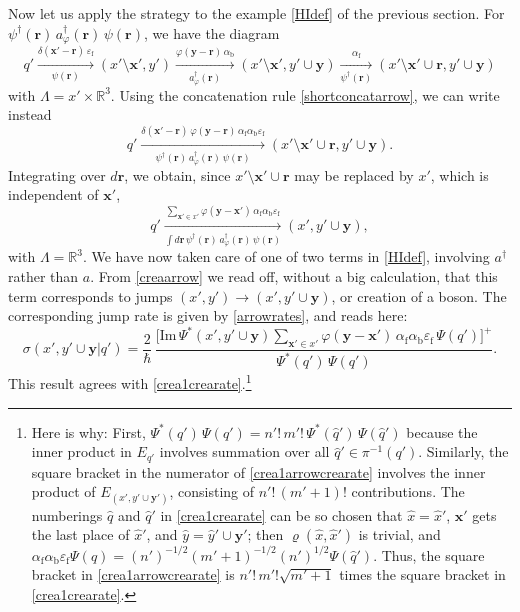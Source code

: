 \documentclass[12pt]{article}
\newcommand{\RRR}{\mathbb{R}} %
\newcommand{\1}{\mathbf{1}} %
\renewcommand{\Im}{\mathrm{Im}} %
\newcommand{\profile}{\varphi}
\newcommand{\covering}{\pi} %
\newcommand{\permutation}{\varrho} %
\newcommand{\vx}{{\boldsymbol x}} %
\newcommand{\vy}{{\boldsymbol y}}
\newcommand{\vr}{{\boldsymbol r}}
\newcommand{\fer}{{\mathrm{f}}} %
\newcommand{\bos}{{\mathrm{b}}} %
\begin{document}
Now let us apply the strategy to the example \eqref{HIdef} of the
previous section. For $\psi^\dag(\vr) \, a^\dag_\profile(\vr) \,
\psi(\vr)$, we have the diagram
\[
   q' \xrightarrow[\psi(\vr)]{\delta(\vx'-\vr) \, \varepsilon_\fer} (x'
   \setminus \vx', y') \xrightarrow[a^\dag_\profile(\vr)]{\profile(\vy
   -\vr) \, \alpha_\bos} (x' \setminus \vx',y' \cup \vy)
   \xrightarrow[\psi^\dag(\vr)] {\alpha_\fer} (x' \setminus \vx' \cup
   \vr,y' \cup \vy)
\]
with $\Lambda = x' \times \RRR^3$. Using the concatenation rule
\eqref{shortconcatarrow}, we can write instead
\[
   q' \xrightarrow[\psi^\dag(\vr) \, a^\dag_\profile(\vr) \,
   \psi(\vr)]{\delta(\vx'-\vr) \,\profile(\vy -\vr) \, \alpha_\fer
   \alpha_\bos \varepsilon_\fer} (x' \setminus \vx' \cup \vr,y' \cup 
\vy).
\]
Integrating over $d\vr$, we obtain, since $x' \setminus \vx' \cup \vr$ 
may
be replaced by $x'$, which is independent of $\vx'$,
\begin{equation}\label{creaarrow}
   q' \xrightarrow[\int d\vr \, \psi^\dag(\vr) \, a^\dag_\profile(\vr)
   \, \psi(\vr)]{\sum\limits_{\vx' \in x'}\profile(\vy -\vx') \,
   \alpha_\fer \alpha_\bos \varepsilon_\fer} (x',y' \cup \vy),
\end{equation}
with $\Lambda =  \RRR^3$.  We have now taken care of one of two terms in
\eqref{HIdef}, involving
$a^\dag$ rather than $a$. {}From \eqref{creaarrow} we read off, without
a big calculation, that this term corresponds to jumps $(x',y') \to
(x',y'\cup \vy)$, or creation of a boson. The corresponding jump rate
is given by \eqref{arrowrates}, and reads here:
\begin{equation}\label{crea1arrowcrearate}
   \sigma(x',y' \cup \vy|q') = \frac{2}{\hbar} \, \frac{\Big[\Im \,
   \Psi^*(x',y' \cup \vy) \sum\limits_{\vx' \in x'} \profile(\vy -\vx')
   \, \alpha_\fer \alpha_\bos \varepsilon_\fer \, \Psi(q')\Big]^+}
   {\Psi^*(q') \, \Psi(q')}.
\end{equation}
This result agrees with \eqref{crea1crearate}.\footnote{Here is why:
First, $\Psi^*(q') \, \Psi(q') = n'! \, m'! \, \Psi^*(\hat{q}') \,
\Psi(\hat{q}')$ because the inner product in $E_{q'}$ involves
summation over all $\hat{q}' \in \covering^{-1}(q')$. Similarly, the
square bracket in the numerator of \eqref{crea1arrowcrearate}
involves the inner product of $E_{(x',y' \cup \vy')}$, consisting of
$n'! \, (m'+1)!$ contributions. The numberings $\hat{q}$ and
$\hat{q}'$ in \eqref{crea1crearate} can be so chosen that $\hat{x} =
\hat{x}'$, $\vx'$ gets the last place of $\hat{x}'$, and $\hat{y} =
\hat{y}' \cup \vy'$; then $\permutation(\hat{x},\hat{x}')$ is trivial,
and $\alpha_\fer \alpha_\bos \varepsilon_\fer \Psi(\hat{q}) = 
(n')^{-1/2}
(m'+1)^{-1/2} (n')^{1/2} \Psi(\hat{q}')$. Thus, the square bracket in
\eqref{crea1arrowcrearate} is $n'! \, m'!\sqrt{m'+1}$ times the
square bracket in \eqref{crea1crearate}.}
\end{document}
